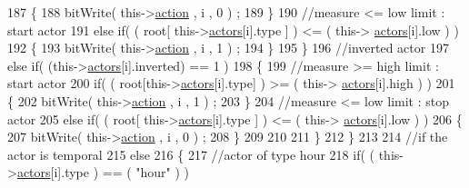\begin{DoxyCode}
187                         \{   
188                             bitWrite( this->\hyperlink{class_jetpack_aca3142925a7b0834b34ae91d26af7765}{action} , i , 0 ) ;    
189                         \}
190                         \textcolor{comment}{//measure <= low limit : start actor}
191                         \textcolor{keywordflow}{else} \textcolor{keywordflow}{if}( ( root[ this->\hyperlink{class_jetpack_a7e16d2f97837f9712a2e6de1c50d99db}{actors}[i].type ] ) <= ( this->
      \hyperlink{class_jetpack_a7e16d2f97837f9712a2e6de1c50d99db}{actors}[i].low ) )
192                         \{
193                             bitWrite( this->\hyperlink{class_jetpack_aca3142925a7b0834b34ae91d26af7765}{action} , i , 1 ) ;                    
194                         \}
195                     \}
196                     \textcolor{comment}{//inverted actor}
197                     \textcolor{keywordflow}{else} \textcolor{keywordflow}{if}( (this->\hyperlink{class_jetpack_a7e16d2f97837f9712a2e6de1c50d99db}{actors}[i].inverted) == 1 )
198                     \{
199                         \textcolor{comment}{//measure >= high limit : start actor}
200                         \textcolor{keywordflow}{if}( ( root[this->\hyperlink{class_jetpack_a7e16d2f97837f9712a2e6de1c50d99db}{actors}[i].type] ) >= ( this->
      \hyperlink{class_jetpack_a7e16d2f97837f9712a2e6de1c50d99db}{actors}[i].high ) )    
201                         \{   
202                             bitWrite( this->\hyperlink{class_jetpack_aca3142925a7b0834b34ae91d26af7765}{action} , i , 1 ) ;    
203                         \}
204                         \textcolor{comment}{//measure <= low limit : stop actor}
205                         \textcolor{keywordflow}{else} \textcolor{keywordflow}{if}( ( root[ this->\hyperlink{class_jetpack_a7e16d2f97837f9712a2e6de1c50d99db}{actors}[i].type ] ) <= ( this->
      \hyperlink{class_jetpack_a7e16d2f97837f9712a2e6de1c50d99db}{actors}[i].low ) )
206                         \{
207                             bitWrite( this->\hyperlink{class_jetpack_aca3142925a7b0834b34ae91d26af7765}{action} , i , 0 ) ;                    
208                         \}
209 
210                     
211                     \}
212                 \}
213 
214                 \textcolor{comment}{//if the actor is temporal}
215                 \textcolor{keywordflow}{else}
216                 \{
217                     \textcolor{comment}{//actor of type hour}
218                     \textcolor{keywordflow}{if}( ( this->\hyperlink{class_jetpack_a7e16d2f97837f9712a2e6de1c50d99db}{actors}[i].type ) == ( \textcolor{stringliteral}{"hour"} ) )  

\end{DoxyCode}
